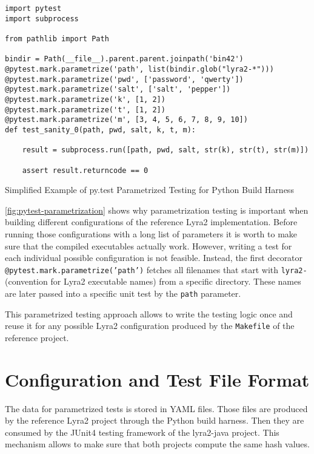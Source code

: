 \begin{listing}
\begin{verbatim}
import pytest
import subprocess

from pathlib import Path

bindir = Path(__file__).parent.parent.joinpath('bin42')
@pytest.mark.parametrize('path', list(bindir.glob("lyra2-*")))
@pytest.mark.parametrize('pwd', ['password', 'qwerty'])
@pytest.mark.parametrize('salt', ['salt', 'pepper'])
@pytest.mark.parametrize('k', [1, 2])
@pytest.mark.parametrize('t', [1, 2])
@pytest.mark.parametrize('m', [3, 4, 5, 6, 7, 8, 9, 10])
def test_sanity_0(path, pwd, salt, k, t, m):

    result = subprocess.run([path, pwd, salt, str(k), str(t), str(m)])

    assert result.returncode == 0
\end{verbatim}
\caption{Simplified Example of py.test Parametrized Testing for Python Build Harness}
\label{fig:pytest-parametrization}
\end{listing}

\autoref{fig:pytest-parametrization} shows why parametrization testing is important when building different configurations of the reference Lyra2 implementation. Before running those configurations with a long list of parameters it is worth to make sure that the compiled executables actually work. However, writing a test for each individual possible configuration is not feasible. Instead, the first decorator \texttt{@pytest.mark.parametrize('path')} fetches all filenames that start with \texttt{lyra2-} (convention for Lyra2 executable names) from a specific directory. These names are later passed into a specific unit test by the \texttt{path} parameter.

This parametrized testing approach allows to write the testing logic once and reuse it for any possible Lyra2 configuration produced by the \texttt{Makefile} of the reference project.

\section{Configuration and Test File Format}
\label{sec:configuration-and-test-file-format}

The data for parametrized tests is stored in YAML files. Those files are produced by the reference Lyra2 project through the Python build harness. Then they are consumed by the JUnit4 testing framework of the lyra2-java project. This mechanism allows to make sure that both projects compute the same hash values.

